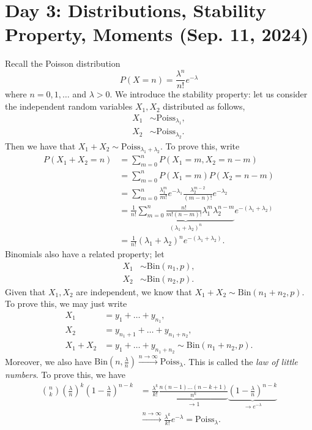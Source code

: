 \section{Day 3: Distributions, Stability Property, Moments (Sep. 11, 2024)}
Recall the Poisson distribution
\[ P(X = n) = \frac{\lambda^n}{n!}e^{-\lambda} \]
where $n = 0, 1, \dots$ and $\lambda > 0$. We introduce the stability property: let us consider the independent random variables $X_1, X_2$ distributed as follows,
\begin{align*}
    X_1 &\sim \mathrm{Poiss}_{\lambda_1}, \\
    X_2 &\sim \mathrm{Poiss}_{\lambda_2}.
\end{align*}
Then we have that $X_1 + X_2 \sim \mathrm{Poiss}_{\lambda_1 + \lambda_2}$. To prove this, write
\begin{align*}
    P(X_1 + X_2 = n) &= \sum_{m=0}^n P(X_1 = m, X_2 = n-m) \\
    &= \sum_{m=0}^n P(X_1 = m) P(X_2 = n-m) \\
    &= \sum_{m=0}^n \frac{\lambda_1^m}{m!} e^{-\lambda_1} \frac{\lambda_2^{m-2}}{(m-n)!} e^{-\lambda_2} \\
    &= \frac{1}{n!} \underbrace{\sum_{m=0}^n \frac{n!}{m!(n - m)!} \lambda_1^m \lambda_2^{n-m}}_{(\lambda_1 + \lambda_2)^n} e^{-(\lambda_1 + \lambda_2)} \\
    &= \frac{1}{n!} (\lambda_1 + \lambda_2)^n e^{-(\lambda_1 + \lambda_2)}.
\end{align*}
Binomials also have a related property; let
\begin{align*}
    X_1 &\sim \mathrm{Bin}(n_1, p), \\
    X_2 &\sim \mathrm{Bin}(n_2, p).
\end{align*}
Given that $X_1, X_2$ are independent, we know that $X_1 + X_2 \sim \mathrm{Bin}(n_1 + n_2, p)$. To prove this, we may just write
\begin{align*}
    X_1 &= y_1 + \dots + y_{n_1}, \\
    X_2 &= y_{n_1 + 1} + \dots + y_{n_1 + n_2}, \\
    X_1 + X_2 &= y_1 + \dots + y_{n_1 + n_2} \sim \mathrm{Bin}(n_1 + n_2, p).
\end{align*}
Moreover, we also have $\mathrm{Bin}(n, \frac{\lambda}{n}) \stackrel{n \to \infty}{\to} \mathrm{Poiss}_\lambda$. This is called the \textit{law of little numbers}. To prove this, we have
\begin{align*}
    \binom{n}{k} \left(\frac{\lambda}{n}\right)^k \left(1 - \frac{\lambda}{n}\right)^{n-k} &= \frac{\lambda^k}{k!} \underbrace{\frac{n (n-1) \dots (n - k + 1)}{n^k}}_{\to 1} \underbrace{\left(1 - \frac{\lambda}{n}\right)^{n-k}}_{\to e^{-\lambda}} \\
    &\stackrel{n \to \infty}{\to} \frac{\lambda^k}{k!} e^{-\lambda} = \mathrm{Poiss}_\lambda.
\end{align*}

